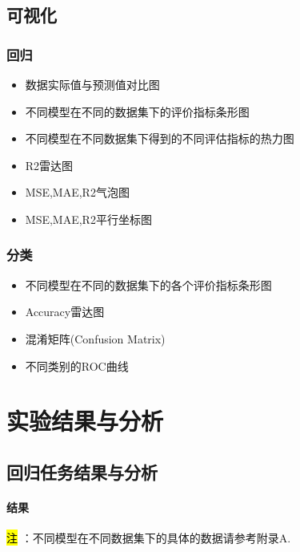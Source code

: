 \documentclass[10pt]{article}
\begin{document}
\subsection{可视化}
\subsubsection*{回归}
\begin{itemize}
  \item 数据实际值与预测值对比图
  \item 不同模型在不同的数据集下的评价指标条形图
  \item 不同模型在不同数据集下得到的不同评估指标的热力图
  \item R2雷达图
  \item MSE,MAE,R2气泡图
  \item MSE,MAE,R2平行坐标图
\end{itemize}

\subsubsection*{分类}
\begin{itemize}
  \item 不同模型在不同的数据集下的各个评价指标条形图
  \item Accuracy雷达图
  \item 混淆矩阵(Confusion Matrix)
  \item 不同类别的ROC曲线
\end{itemize}
\newpage
\section{实验结果与分析}
\subsection{回归任务结果与分析}
\paragraph{结果}
\noindent \hl{注 }：不同模型在不同数据集下的具体的数据请参考附录A.
\end{document}
